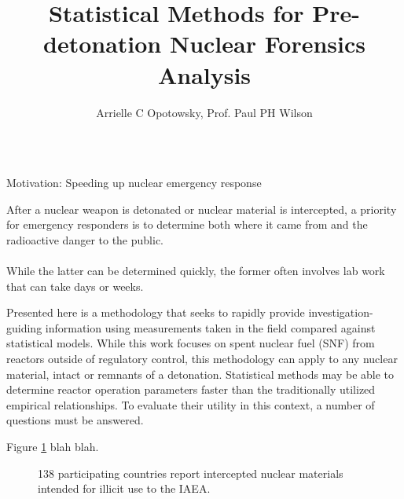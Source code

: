 \documentclass{beamer}
\title[small title]{\texorpdfstring{Statistical Methods for Pre-detonation Nuclear Forensics Analysis}
{Statistical Methods for Pre-detonation Nuclear Forensics Analysis}}
\author{Arrielle C Opotowsky, Prof. Paul PH Wilson}
\institute{University of Wisconsin-Madison}
\begin{document}
\small

\begin{frame}[t]{}
\begin{columns}

\begin{column}[T]{0.27\textwidth}
\begin{block}{Motivation: Speeding up nuclear emergency response}

After a nuclear weapon is detonated or nuclear material is intercepted, a
priority for emergency responders is to determine both where it came from and
the radioactive danger to the public. \\~\\

While the latter can be determined
quickly, the former often involves lab work that can take days or weeks.

Presented here is a methodology that seeks to rapidly provide
investigation-guiding information using measurements taken in the field
compared against statistical models. While this work focuses on spent nuclear
fuel (SNF) from reactors outside of regulatory control, this methodology can
apply to any nuclear material, intact or remnants of a detonation. 
Statistical methods may be able to determine reactor operation parameters
faster than the traditionally utilized empirical relationships. To evaluate
their utility in this context, a number of questions must be answered.

Figure \ref{fig:itdb} blah blah.

\begin{figure}
  \fboxsep=1mm
  \fboxrule=3pt
  \caption{138 participating countries report intercepted nuclear materials
           intended for illicit use to the IAEA.\cite{trafficking}}
  \label{fig:itdb}
\end{figure}


\end{block}
\end{column}
\end{columns}
\end{frame}
\end{document}
